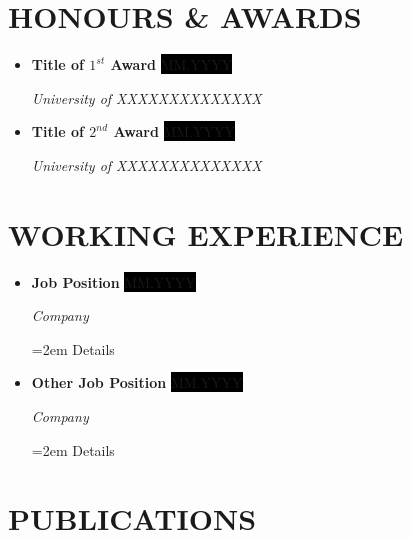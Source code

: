 \documentclass[paper=a4,fontsize=11pt]{scrartcl} %
\newcommand{\sepspace}{\vspace*{1em}}		%
\newcommand{\NewPart}[1]{\section*{\uppercase{#1}}}
\newcommand{\EducationEntry}[4]{
		\noindent \textbf{#1} \hfill      %
		\colorbox{Black}{%
			\parbox{6em}{%
			\hfill\color{White}#2}} \par  %
		\noindent \textit{#3} \par        %
		\noindent\hangindent=2em\hangafter=0 \small #4 %
		\normalsize \par}
\newcommand{\AwardEntry}[3]{
		\noindent \textbf{#1} \hfill      %
		\colorbox{Black}{\color{White}#2} \par  %
		\noindent \textit{#3} \par              %
		\normalsize \par}
\newcommand{\WorkEntry}[4]{				  %
		\noindent \textbf{#1} \hfill      %
		\colorbox{Black}{\color{White}#2} \par  %
		\noindent \textit{#3} \par              %
		\noindent\hangindent=2em\hangafter=0 \small #4 %
		\normalsize \par}
\begin{document}
\NewPart{Honours \& Awards}

\begin{itemize}[leftmargin=*]
    \item \AwardEntry{Title of $1^{st}$ Award}{\footnotesize MM.YYYY}{University of XXXXXXXXXXXXXX}
    \item \AwardEntry{Title of $2^{nd}$ Award}{\footnotesize MM.YYYY}{University of XXXXXXXXXXXXXX}
\end{itemize}
\sepspace





\NewPart{Working Experience}

\begin{itemize}[leftmargin=*]
    \item \WorkEntry{Job Position}{\footnotesize MM.YYYY}{Company}{Details}
    \item \WorkEntry{Other Job Position}{\footnotesize MM.YYYY}{Company}{Details}
\end{itemize}
\sepspace





\NewPart{Publications}
\end{document}

